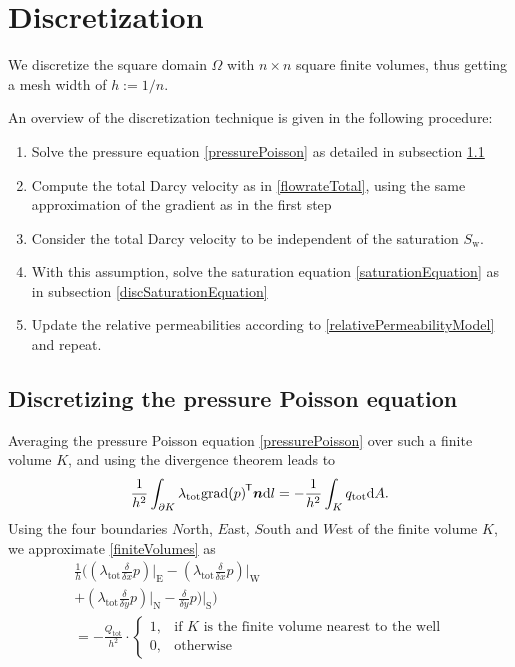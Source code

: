 \documentclass[conference]{IEEEtran}
\DeclareMathOperator*{\grad}{grad}
\renewcommand*{\d}[1]{\ensuremath{\mathrm{d}#1}}
\newcommand*{\ddiff}[2]{\ensuremath{\frac{\delta}{\delta{#2}}{#1}}}
\renewcommand*{\vec}[1]{\ensuremath{{\bm{#1}}}}
\newcommand*{\transpose}[1]{{#1}^{\mkern-1.5mu\mathsf{T}}}
\newcommand*{\iprod}[3]{\ensuremath{\ifstrempty{#1}{\transpose{#2} {#3}}{\transpose{#1} {#2} {#3}}}}
\begin{document}
\section{Discretization}
We discretize the square domain $\Omega$ with $n \times n$ square finite volumes, thus getting a mesh width of $h := 1/n$.

An overview of the discretization technique is given in the following procedure:
\begin{enumerate}
	\item Solve the pressure equation \eqref{pressurePoisson} as detailed in subsection \ref{discPressurePoisson}
	\item Compute the total Darcy velocity as in \eqref{flowrateTotal}, using the same approximation of the gradient as in the first step
	\item Consider the total Darcy velocity to be independent of the saturation $S_\text{w}.$
	\item With this assumption, solve the saturation equation \eqref{saturationEquation} as in subsection \ref{discSaturationEquation}
	\item Update the relative permeabilities according to \eqref{relativePermeabilityModel} and repeat.
\end{enumerate}

\subsection{Discretizing the pressure Poisson equation}
\label{discPressurePoisson}
Averaging the pressure Poisson equation \eqref{pressurePoisson} over such a finite volume $K$, and using the divergence theorem leads to
\begin{equation}
\label{finiteVolumes}
\frac{1}{h^2} \int_{\partial K} \lambda_\text{tot} \iprod{}{\grad(p)}{\vec{n}} \d{l} = -\frac{1}{h^2} \int_K q_\text{tot} \d{A}.
\end{equation}
Using the four boundaries $N$orth, $E$ast, $S$outh and $W$est of the finite volume $K$, we approximate \eqref{finiteVolumes} as
\begin{multline}
\frac{1}{h}\biggr( (\lambda_\text{tot} \ddiff{p}{x})\lvert_\text{E} - (\lambda_\text{tot} \ddiff{p}{x})\lvert_\text{W} \\+ (\lambda_\text{tot}\ddiff{p}{y})\lvert_\text{N}
- \ddiff{p}{y})\lvert_\text{S} \biggr) \\= - \frac{Q_\text{tot}}{h^2} \cdot \begin{cases} 1, &\text{if } K \text{ is the finite volume nearest to the well} \\
0, & \text{otherwise} \end{cases}
\end{multline}
\end{document}
